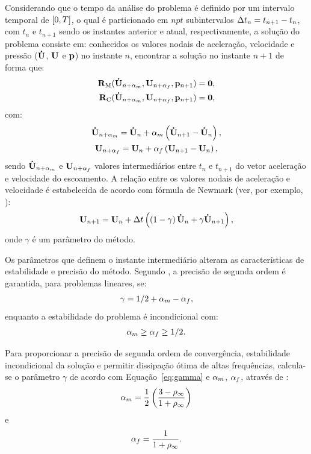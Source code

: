 Considerando que o tempo da análise do problema é definido por um intervalo temporal de $[0,T]$, o qual é particionado em $npt$ subintervalos $\Delta t_{n} = t_{n+1} - t_{n}$, com $t_{n}$ e $t_{n+1}$ sendo os instantes anterior e atual, respectivamente, a solução do problema consiste em: conhecidos os valores nodais de aceleração, velocidade e pressão ($\mathbf{\dot{U}}$, $\mathbf{U}$ e $\mathbf{p}$) no instante $n$, encontrar a solução no instante $n+1$ de forma que:
\begin{align}
\mathbf{R}_\mathrm{M}(\mathbf{\dot{U}}_{n+\alpha_m},\mathbf{U}_{n+\alpha_f},\mathbf{p}_{n+1}) = \mathbf{0}, \label{eq:resid_QM_alpha}\\
\mathbf{R}_\mathrm{C}(\mathbf{\dot{U}}_{n+\alpha_m},\mathbf{U}_{n+\alpha_f},\mathbf{p}_{n+1}) = \mathbf{0}, \label{eq:resid_cont_alpha}
\end{align}
\noindent com:
\begin{gather}
\mathbf{\dot{U}}_{n+\alpha_m} = \mathbf{\dot{U}}_n + \alpha_m \left( \mathbf{\dot{U}}_{n+1} - \mathbf{\dot{U}}_n \right), \label{eq:inter_acel}\\
\mathbf{U}_{n+\alpha_f} = \mathbf{U}_n + \alpha_f \left( \mathbf{U}_{n+1} - \mathbf{U}_n \right), \label{eq:inter_vel}
\end{gather}
\noindent sendo $\mathbf{\dot{U}}_{n+\alpha_m}$ e $\mathbf{U}_{n+\alpha_f}$ valores intermediários entre $t_{n}$ e $t_{n+1}$ do vetor aceleração e velocidade do escoamento. A relação entre os valores nodais de aceleração e velocidade é estabelecida de acordo com fórmula de Newmark (ver, por exemplo, \cite{Hughes:1976}):
\begin{gather}
\mathbf{U}_{n+1} = \mathbf{U}_n + \Delta t\left(\left(1-\gamma\right)\mathbf{\dot{U}}_n + \gamma\mathbf{\dot{U}}_{n+1} \right), \label{eq:Newmark}
\end{gather}
\noindent onde $\gamma$ é um parâmetro do método.

Os parâmetros que definem o instante intermediário alteram as características de estabilidade e precisão do método. Segundo , a precisão de segunda ordem é garantida, para problemas lineares, se: 
\begin{gather}
\gamma = 1/2 + \alpha_m - \alpha_f,\label{eq:gamma}
\end{gather}
\noindent enquanto a estabilidade do problema é incondicional com:
\begin{gather}
\alpha_m \ge \alpha_f \ge 1/2.
\end{gather}

Para proporcionar a precisão de segunda ordem de convergência, estabilidade incondicional da solução e permitir dissipação ótima de altas frequências, calcula-se o parâmetro $\gamma$ de acordo com Equação~\eqref{eq:gamma} e $\alpha_m$, $\alpha_f$, através de \cite{Hughes:2000}:
\begin{gather}
\alpha_m = \frac{1}{2}\left(\frac{3 - \rho_\infty}{1+\rho_\infty}\right)\label{eq:alpha_m}
\end{gather}
\noindent e
\begin{gather}
\alpha_f = \frac{1}{1+\rho_\infty}\label{eq:alpha_f}.
\end{gather}

